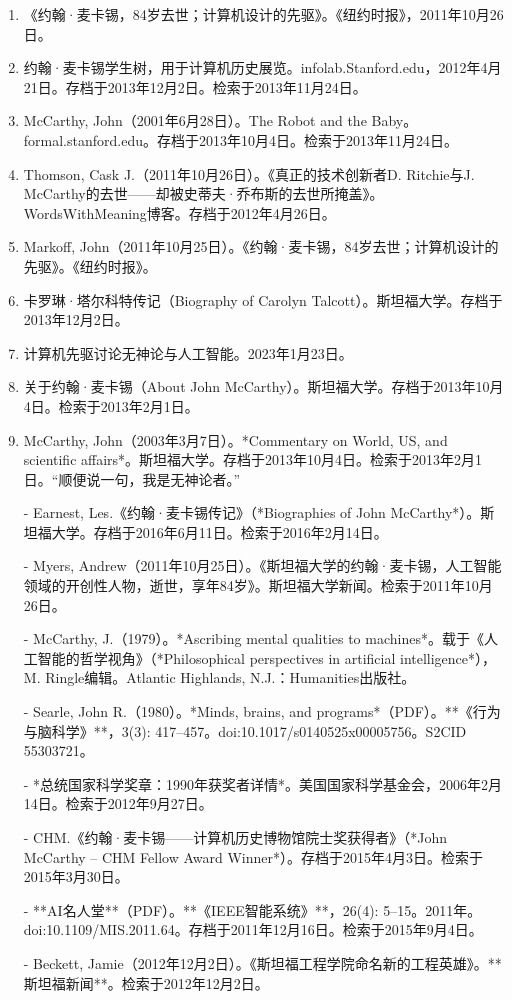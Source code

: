 \begin{enumerate}
\item 《约翰·麦卡锡，84岁去世；计算机设计的先驱》。《纽约时报》，2011年10月26日。
\item 约翰·麦卡锡学生树，用于计算机历史展览。infolab.Stanford.edu，2012年4月21日。存档于2013年12月2日。检索于2013年11月24日。
\item McCarthy, John（2001年6月28日）。The Robot and the Baby。formal.stanford.edu。存档于2013年10月4日。检索于2013年11月24日。
\item Thomson, Cask J.（2011年10月26日）。《真正的技术创新者D. Ritchie与J. McCarthy的去世——却被史蒂夫·乔布斯的去世所掩盖》。WordsWithMeaning博客。存档于2012年4月26日。
\item Markoff, John（2011年10月25日）。《约翰·麦卡锡，84岁去世；计算机设计的先驱》。《纽约时报》。
\item 卡罗琳·塔尔科特传记（Biography of Carolyn Talcott）。斯坦福大学。存档于2013年12月2日。
\item 计算机先驱讨论无神论与人工智能。2023年1月23日。
\item 关于约翰·麦卡锡（About John McCarthy）。斯坦福大学。存档于2013年10月4日。检索于2013年2月1日。
\item McCarthy, John（2003年3月7日）。*Commentary on World, US, and scientific affairs*。斯坦福大学。存档于2013年10月4日。检索于2013年2月1日。“顺便说一句，我是无神论者。”

- Earnest, Les.《约翰·麦卡锡传记》（*Biographies of John McCarthy*）。斯坦福大学。存档于2016年6月11日。检索于2016年2月14日。

- Myers, Andrew（2011年10月25日）。《斯坦福大学的约翰·麦卡锡，人工智能领域的开创性人物，逝世，享年84岁》。斯坦福大学新闻。检索于2011年10月26日。

- McCarthy, J.（1979）。*Ascribing mental qualities to machines*。载于《人工智能的哲学视角》（*Philosophical perspectives in artificial intelligence*），M. Ringle编辑。Atlantic Highlands, N.J.：Humanities出版社。

- Searle, John R.（1980）。*Minds, brains, and programs*（PDF）。**《行为与脑科学》**，3(3): 417–457。doi:10.1017/s0140525x00005756。S2CID 55303721。

- *总统国家科学奖章：1990年获奖者详情*。美国国家科学基金会，2006年2月14日。检索于2012年9月27日。

- CHM.《约翰·麦卡锡——计算机历史博物馆院士奖获得者》（*John McCarthy – CHM Fellow Award Winner*）。存档于2015年4月3日。检索于2015年3月30日。

- **AI名人堂**（PDF）。**《IEEE智能系统》**，26(4): 5–15。2011年。doi:10.1109/MIS.2011.64。存档于2011年12月16日。检索于2015年9月4日。

- Beckett, Jamie（2012年12月2日）。《斯坦福工程学院命名新的工程英雄》。**斯坦福新闻**。检索于2012年12月2日。
\end{enumerate}